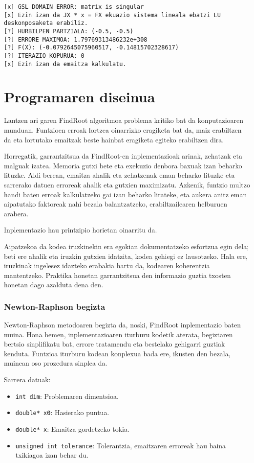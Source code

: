 \documentclass[10pt,a4paper,basque]{article}
\begin{document}
\begin{lstlisting}
[x] GSL DOMAIN ERROR: matrix is singular
[x] Ezin izan da JX * x = FX ekuazio sistema lineala ebatzi LU deskonposaketa erabiliz.
[?] HURBILPEN PARTZIALA: (-0.5, -0.5)
[?] ERRORE MAXIMOA: 1.79769313486232e+308
[?] F(X): (-0.0792645075960517, -0.14815702328617)
[?] ITERAZIO_KOPURUA: 0
[x] Ezin izan da emaitza kalkulatu.
\end{lstlisting}

\section{Programaren diseinua}

Lantzen ari garen FindRoot algoritmoa problema kritiko bat da konputazioaren munduan. Funtzioen erroak lortzea oinarrizko eragiketa bat da, maiz erabiltzen da eta lortutako emaitzak beste hainbat eragiketa egiteko erabiltzen dira.

Horregatik, garrantzitsua da FindRoot-en inplementazioak arinak, zehatzak eta malguak izatea. Memoria gutxi bete eta exekuzio denbora baxuak izan beharko lituzke. Aldi berean, emaitza ahalik eta zehatzenak eman beharko lituzke eta sarrerako datuen erroreak ahalik eta gutxien maximizatu. Azkenik, funtzio multzo handi baten erroak kalkulatzeko gai izan beharko lirateke, eta aukera anitz eman aipatutako faktoreak nahi bezala balantzatzeko, erabiltzailearen helburuen arabera.

Inplementazio hau printzipio horietan oinarritu da.

Aipatzekoa da kodea iruzkinekin era egokian dokumentatzeko esfortzua egin dela; beti ere ahalik eta iruzkin gutxien idatzita, kodea gehiegi ez lausotzeko. Hala ere, iruzkinak ingelesez idazteko erabakia hartu da, kodearen koherentzia mantentzeko. Praktika honetan garrantzitsua den informazio guztia txosten honetan dago azalduta dena den.

\subsubsection{Newton-Raphson begizta}

Newton-Raphson  metodoaren begizta da, noski, FindRoot inplementazio baten muina. Hona hemen, inplementazioaren iturburu kodetik aterata, begiztaren bertsio sinplifikatu bat, errore tratamendu eta bestelako gehigarri guztiak kenduta. Funtzioa iturburu kodean konplexua bada ere, ikusten den bezala, muinean oso prozedura sinplea da.

Sarrera datuak:
\begin{itemize}
\item \verb|int dim|: Problemaren dimentsioa.
\item \verb|double* x0|: Hasierako puntua.
\item \verb|double* x|: Emaitza gordetzeko tokia.
\item \verb|unsigned int tolerance|: Tolerantzia, emaitzaren erroreak hau baina txikiagoa izan behar du.
\end{itemize}
\end{document}
